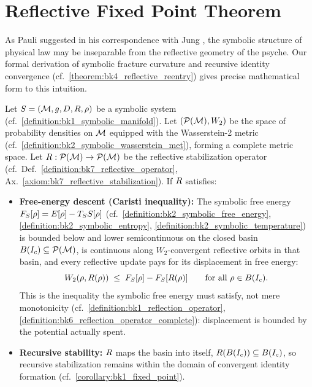 \section{Reflective Fixed Point Theorem}
\label{sec:bk7_reflective_fixed_point_theorem}
As Pauli suggested in his correspondence with Jung \cite{pauli1994atom}, the symbolic structure of physical law may be inseparable from the reflective geometry of the psyche. Our formal derivation of symbolic fracture curvature and recursive identity convergence (cf.~\ref{theorem:bk4_reflective_reentry}) gives precise mathematical form to this intuition.
\begin{theorem}
\label{theorem:bk7_reflective_convergence_to_stable_identity}
Let $S = (\mathcal{M}, g, D, R, \rho)$ be a symbolic system (cf.~\ref{definition:bk1_symbolic_manifold}). Let $(\mathcal{P}(\mathcal{M}), W_2)$ be the space of probability densities on $\mathcal{M}$ equipped with the Wasserstein-2 metric (cf.~\ref{definition:bk2_symbolic_wasserstein_met}), forming a complete metric space. Let $R : \mathcal{P}(\mathcal{M}) \to \mathcal{P}(\mathcal{M})$ be the reflective stabilization operator (cf.~Def.~\ref{definition:bk7_reflective_operator}, Ax.~\ref{axiom:bk7_reflective_stabilization}). If $R$ satisfies:
\begin{itemize}
    \item[(i)] \textbf{Free-energy descent (Caristi inequality):} The symbolic free energy $F_S[\rho] = E[\rho] - T_S S[\rho]$ (cf.~\ref{definition:bk2_symbolic_free_energy}, \ref{definition:bk2_symbolic_entropy}, \ref{definition:bk2_symbolic_temperature}) is bounded below and lower semicontinuous on the closed basin $B(I_c) \subseteq \mathcal{P}(\mathcal{M})$, is continuous along $W_2$-convergent reflective orbits in that basin, and every reflective update pays for its displacement in free energy:
    \[
    W_2(\rho, R(\rho)) \;\leq\; F_S[\rho] - F_S[R(\rho)]
    \qquad \text{for all } \rho \in B(I_c).
    \]
    This is the inequality the symbolic free energy must satisfy, not mere monotonicity (cf.~\ref{definition:bk1_reflection_operator}, \ref{definition:bk6_reflection_operator_complete}): displacement is bounded by the potential actually spent.
    \item[(ii)] \textbf{Recursive stability:} $R$ maps the basin into itself, $R(B(I_c)) \subseteq B(I_c)$, so recursive stabilization remains within the domain of convergent identity formation (cf.~\ref{corollary:bk1_fixed_point}).

\end{itemize}
\end{theorem}
